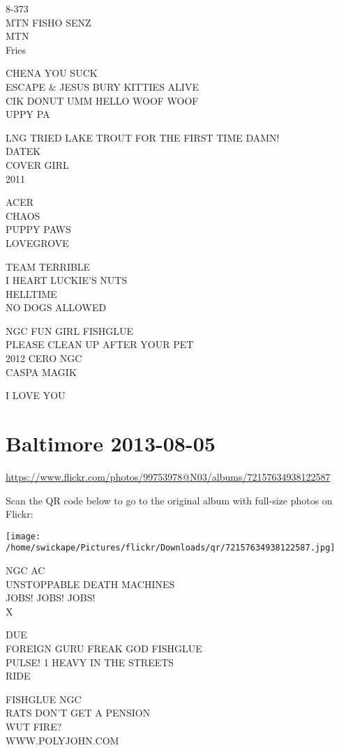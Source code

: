 \documentclass[10pt,letterpaper]{article}
\begin{document}
8{-}373\\
MTN FISHO SENZ\\
MTN\\
Fries

CHENA YOU SUCK\\
ESCAPE \& JESUS BURY KITTIES ALIVE\\
CIK DONUT UMM HELLO WOOF WOOF\\
UPPY PA

LNG TRIED LAKE TROUT FOR THE FIRST TIME DAMN!\\
DATEK\\
COVER GIRL\\
2011

ACER\\
CHAOS\\
PUPPY PAWS\\
LOVEGROVE

TEAM TERRIBLE\\
I HEART LUCKIE'S NUTS\\
HELLTIME\\
NO DOGS ALLOWED

NGC FUN GIRL FISHGLUE\\
PLEASE CLEAN UP AFTER YOUR PET\\
2012 CERO NGC\\
CASPA MAGIK

I LOVE YOU


\section*{Baltimore 2013-08-05}

\url{https://www.flickr.com/photos/99753978@N03/albums/72157634938122587}

Scan the QR code below to go to the original album with full-size photos on Flickr:

\texttt{[image: /home/swickape/Pictures/flickr/Downloads/qr/72157634938122587.jpg]}


NGC AC\\
UNSTOPPABLE DEATH MACHINES\\
JOBS! JOBS! JOBS!\\
X

DUE\\
FOREIGN GURU FREAK GOD FISHGLUE\\
PULSE! 1 HEAVY IN THE STREETS\\
RIDE

FISHGLUE NGC\\
RATS DON'T GET A PENSION\\
WUT FIRE?\\
WWW.POLYJOHN.COM
\end{document}

